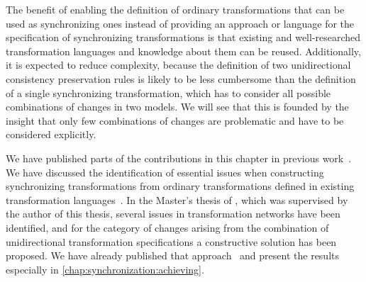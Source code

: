
The benefit of enabling the definition of ordinary transformations that can be used as synchronizing ones instead of providing an approach or language for the specification of synchronizing transformations is that existing and well-researched transformation languages and knowledge about them can be reused.
Additionally, it is expected to reduce complexity, because the definition of two unidirectional consistency preservation rules is likely to be less cumbersome than the definition of a single synchronizing transformation, which has to consider all possible combinations of changes in two models.
We will see that this is founded by the insight that only few combinations of changes are problematic and have to be considered explicitly.

We have published parts of the contributions in this chapter in previous work~.
We have discussed the identification of essential issues when constructing synchronizing transformations from ordinary transformations defined in existing transformation languages~.
In the Master's thesis of , which was supervised by the author of this thesis, several issues in transformation networks have been identified, and for the category of changes arising from the combination of unidirectional transformation specifications a constructive solution has been proposed.
We have already published that approach~ and present the results especially in \autoref{chap:synchronization:achieving}.





